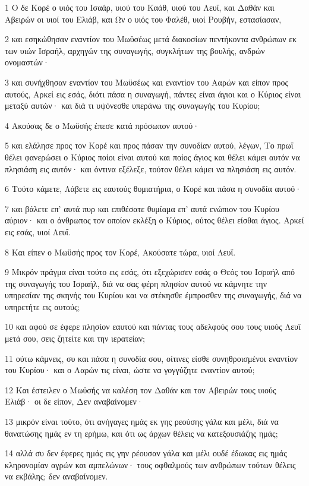 \par 1 Ο δε Κορέ ο υιός του Ισαάρ, υιού του Καάθ, υιού του Λευΐ, και Δαθάν και Αβειρών οι υιοί του Ελιάβ, και Ων ο υιός του Φαλέθ, υιοί Ρουβήν, εστασίασαν,
\par 2 και εσηκώθησαν εναντίον του Μωϋσέως μετά διακοσίων πεντήκοντα ανθρώπων εκ των υιών Ισραήλ, αρχηγών της συναγωγής, συγκλήτων της βουλής, ανδρών ονομαστών·
\par 3 και συνήχθησαν εναντίον του Μωϋσέως και εναντίον του Ααρών και είπον προς αυτούς, Αρκεί εις εσάς, διότι πάσα η συναγωγή, πάντες είναι άγιοι και ο Κύριος είναι μεταξύ αυτών· και διά τι υψόνεσθε υπεράνω της συναγωγής του Κυρίου;
\par 4 Ακούσας δε ο Μωϋσής έπεσε κατά πρόσωπον αυτού·
\par 5 και ελάλησε προς τον Κορέ και προς πάσαν την συνοδίαν αυτού, λέγων, Το πρωΐ θέλει φανερώσει ο Κύριος ποίοι είναι αυτού και ποίος άγιος και θέλει κάμει αυτόν να πλησιάση εις αυτόν· και όντινα εξέλεξε, τούτον θέλει κάμει να πλησιάση εις αυτόν.
\par 6 Τούτο κάμετε, Λάβετε εις εαυτούς θυμιατήρια, ο Κορέ και πάσα η συνοδία αυτού·
\par 7 και βάλετε επ' αυτά πυρ και επιθέσατε θυμίαμα επ' αυτά ενώπιον του Κυρίου αύριον· και ο άνθρωπος τον οποίον εκλέξη ο Κύριος, ούτος θέλει είσθαι άγιος. Αρκεί εις εσάς, υιοί Λευΐ.
\par 8 Και είπεν ο Μωϋσής προς τον Κορέ, Ακούσατε τώρα, υιοί Λευΐ.
\par 9 Μικρόν πράγμα είναι τούτο εις εσάς, ότι εξεχώρισεν εσάς ο Θεός του Ισραήλ από της συναγωγής του Ισραήλ, διά να σας φέρη πλησίον αυτού να κάμνητε την υπηρεσίαν της σκηνής του Κυρίου και να στέκησθε έμπροσθεν της συναγωγής, διά να υπηρετήτε εις αυτούς;
\par 10 και αφού σε έφερε πλησίον εαυτού και πάντας τους αδελφούς σου τους υιούς Λευΐ μετά σου, σεις ζητείτε και την ιερατείαν;
\par 11 ούτω κάμνεις, συ και πάσα η συνοδία σου, οίτινες είσθε συνηθροισμένοι εναντίον του Κυρίου· και ο Ααρών τις είναι, ώστε να γογγύζητε εναντίον αυτού;
\par 12 Και έστειλεν ο Μωϋσής να καλέση τον Δαθάν και τον Αβειρών τους υιούς Ελιάβ· οι δε είπον, Δεν αναβαίνομεν·
\par 13 μικρόν είναι τούτο, ότι ανήγαγες ημάς εκ γης ρεούσης γάλα και μέλι, διά να θανατώσης ημάς εν τη ερήμω, και ότι ως άρχων θέλεις να κατεξουσιάζης ημάς;
\par 14 αλλά συ δεν έφερες ημάς εις γην ρέουσαν γάλα και μέλι ουδέ έδωκας εις ημάς κληρονομίαν αγρών και αμπελώνων· τους οφθαλμούς των ανθρώπων τούτων θέλεις να εκβάλης; δεν αναβαίνομεν.
